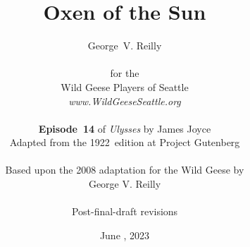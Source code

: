 


\title{\Huge Oxen of the Sun}
\author{George~V. Reilly\\
\\
{\small for the}\\
Wild Geese Players of Seattle\\
{\textit{www.WildGeeseSeattle.org}}\\
\\
{\small \textbf{Episode~14} of \textit{Ulysses} by James Joyce}\\
{\small Adapted from the 1922~edition at Project Gutenberg}
\\
\\
{\small Based upon the 2008 adaptation for the Wild Geese by}\\
{\small George V. Reilly}
\\
\\
{\small Post-final-draft revisions}}
\date{June , 2023}
\raggedbottom



\maketitle

